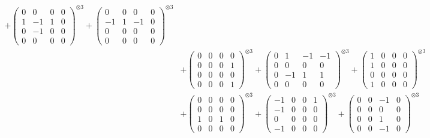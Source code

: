 \documentclass{article}
\begin{document}
{\begin{align}
            + \begin{pmatrix} 0 & 0 & 0 & 0 \\ 1 & -1 & 1 & 0 \\ 0 & -1 & 0 & 0 \\ 0 & 0 & 0 & 0 \end{pmatrix}^{\otimes 3} 
            + \begin{pmatrix} 0 & 0 & 0 & 0 \\ -1 & 1 & -1 & 0 \\ 0 & 0 & 0 & 0 \\ 0 & 0 & 0 & 0 \end{pmatrix}^{\otimes 3} \\
        &+ \label{Rs16-Rc11-Solution-1-c10} \begin{pmatrix} 0 & 0 & 0 & 0 \\ 0 & 0 & 0 & 1 \\ 0 & 0 & 0 & 0 \\ 0 & 0 & 0 & 1 \end{pmatrix}^{\otimes 3} 
            + \begin{pmatrix} 0 & 1 & -1 & -1 \\ 0 & 0 & 0 & 0 \\ 0 & -1 & 1 & 1 \\ 0 & 0 & 0 & 0 \end{pmatrix}^{\otimes 3} 
            + \begin{pmatrix} 1 & 0 & 0 & 0 \\ 1 & 0 & 0 & 0 \\ 0 & 0 & 0 & 0 \\ 1 & 0 & 0 & 0 \end{pmatrix}^{\otimes 3} \\
        &+ \label{Rs16-Rc11-Solution-1-c13} \begin{pmatrix} 0 & 0 & 0 & 0 \\ 0 & 0 & 0 & 0 \\ 1 & 0 & 1 & 0 \\ 0 & 0 & 0 & 0 \end{pmatrix}^{\otimes 3} 
            + \begin{pmatrix} -1 & 0 & 0 & 1 \\ -1 & 0 & 0 & 0 \\ 0 & 0 & 0 & 0 \\ -1 & 0 & 0 & 0 \end{pmatrix}^{\otimes 3} 
            + \begin{pmatrix} 0 & 0 & -1 & 0 \\ 0 & 0 & 0 & 0 \\ 0 & 0 & 1 & 0 \\ 0 & 0 & -1 & 0 \end{pmatrix}^{\otimes 3} \\

\end{align}}
\end{document}
